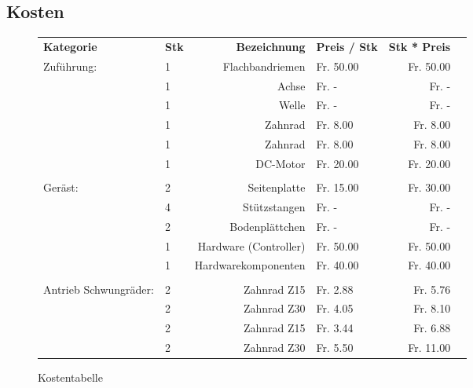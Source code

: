 \subsection{Kosten}

\begin{figure}[h!]

  \centering
  \caption{Kostentabelle}
    \begin{tabular}{p{0.5cm}p{0.8cm}rp{3cm}rr}
    \textbf{Kategorie} & \textbf{Stk} & \textbf{Bezeichnung} & \textbf{Preis / Stk} & \textbf{Stk * Preis} \\

    Zuführung: & 1     & Flachbandriemen &  Fr.        50.00  &  Fr.        50.00  \\
               & 1     & Achse &  Fr.              -    &  Fr.             -    \\
               & 1     & Welle &  Fr.              -    &  Fr.             -    \\
               & 1     & Zahnrad &  Fr.          8.00  &  Fr.          8.00  \\
               & 1     & Zahnrad &  Fr.          8.00  &  Fr.          8.00  \\
               & 1     & DC-Motor &  Fr.        20.00  &  Fr.        20.00  \\
               &       &       &       &  \\
       Geräst: & 2     & Seitenplatte &  Fr.         15.00  &  Fr.        30.00  \\
               & 4     & Stützstangen &  Fr.              -    &  Fr.             -    \\
               & 2     & Bodenplättchen &  Fr.              -    &  Fr.             -    \\
               & 1     & Hardware (Controller) &  Fr.        50.00  &  Fr.        50.00  \\
               & 1     & Hardwarekomponenten &  Fr.        40.00  &  Fr.        40.00  \\
               &       &       &       &  \\
Antrieb Schwungräder: & 2     & Zahnrad Z15 &  Fr.          2.88  &  Fr.          5.76  \\
          & 2     & Zahnrad Z30 &  Fr.          4.05  &  Fr.          8.10  \\
          & 2     & Zahnrad Z15 &  Fr.          3.44  &  Fr.          6.88  \\
          & 2     & Zahnrad Z30 &  Fr.          5.50  &  Fr.         11.00  \\

\end{tabular}
\end{figure}
